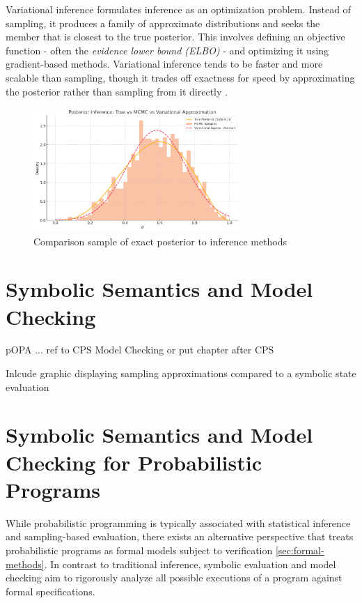 \documentclass[11pt]{report}
\begin{document}
Variational inference formulates inference as an optimization problem. Instead of sampling, it produces a family of approximate distributions and seeks the member that 
is closest to the true posterior. This involves defining an objective function - often the \textit{evidence lower bound (ELBO)} - and optimizing it using gradient-based methods.
Variational inference tends to be faster and more scalable than sampling, though it trades off exactness for speed by approximating the posterior rather than sampling
from it directly \cite{blei2017vi}.


\begin{figure}[htbp]
  \centering
  \includegraphics[width=0.7\textwidth]{graphics/inferencePlot.png}
  \caption{Comparison sample of exact posterior to inference methods}
  \label{fig:inference_plot}
\end{figure}

\section{Symbolic Semantics and Model Checking}
pOPA ... ref to CPS Model Checking or put chapter after CPS

Inlcude graphic displaying sampling approximations compared to a symbolic state evaluation

\section{Symbolic Semantics and Model Checking for Probabilistic Programs}

While probabilistic programming is typically associated with statistical inference and sampling-based evaluation, there exists an alternative perspective
that treats probabilistic programs as formal models subject to verification \ref{sec:formal-methods}. In contrast to traditional inference, symbolic evaluation and 
model checking aim to rigorously analyze all possible executions of a program against formal specifications.
\end{document}

